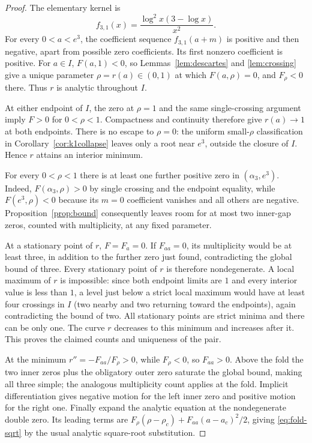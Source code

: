 \documentclass[11pt,letterpaper]{article}
\numberwithin{equation}{section}
\theoremstyle{definition}\newtheorem{definition}[theorem]{Definition}
\theoremstyle{remark}\newtheorem{remark}[theorem]{Remark}
\begin{document}
\begin{proof}
The elementary kernel is
\[
 f_{3,1}(x)=\frac{\log^2x(3-\log x)}{x^2}.
\]
For every $0<a<e^3$, the coefficient sequence $f_{3,1}(a+m)$ is positive and then negative, apart from possible zero coefficients. Its first nonzero coefficient is positive. For $a\in I$, $F(a,1)<0$, so Lemmas~\ref{lem:descartes} and \ref{lem:crossing} give a unique parameter $\rho=r(a)\in(0,1)$ at which $F(a,\rho)=0$, and $F_\rho<0$ there. Thus $r$ is analytic throughout $I$.

At either endpoint of $I$, the zero at $\rho=1$ and the same single-crossing argument imply $F>0$ for $0<\rho<1$. Compactness and continuity therefore give $r(a)\to1$ at both endpoints. There is no escape to $\rho=0$: the uniform small-$\rho$ classification in Corollary~\ref{cor:k1collapse} leaves only a root near $e^3$, outside the closure of $I$. Hence $r$ attains an interior minimum.

For every $0<\rho<1$ there is at least one further positive zero in $(\alpha_3,e^3)$. Indeed, $F(\alpha_3,\rho)>0$ by single crossing and the endpoint equality, while $F(e^3,\rho)<0$ because its $m=0$ coefficient vanishes and all others are negative. Proposition~\ref{prop:bound} consequently leaves room for at most two inner-gap zeros, counted with multiplicity, at any fixed parameter.

At a stationary point of $r$, $F=F_a=0$. If $F_{aa}=0$, its multiplicity would be at least three, in addition to the further zero just found, contradicting the global bound of three. Every stationary point of $r$ is therefore nondegenerate. A local maximum of $r$ is impossible: since both endpoint limits are $1$ and every interior value is less than $1$, a level just below a strict local maximum would have at least four crossings in $I$ (two nearby and two returning toward the endpoints), again contradicting the bound of two. All stationary points are strict minima and there can be only one. The curve $r$ decreases to this minimum and increases after it. This proves the claimed counts and uniqueness of the pair.

At the minimum $r''=-F_{aa}/F_\rho>0$, while $F_\rho<0$, so $F_{aa}>0$. Above the fold the two inner zeros plus the obligatory outer zero saturate the global bound, making all three simple; the analogous multiplicity count applies at the fold. Implicit differentiation gives negative motion for the left inner zero and positive motion for the right one. Finally expand the analytic equation at the nondegenerate double zero. Its leading terms are $F_\rho(\rho-\rho_c)+F_{aa}(a-a_c)^2/2$, giving \eqref{eq:fold-sqrt} by the usual analytic square-root substitution.
\end{proof}
\end{document}

